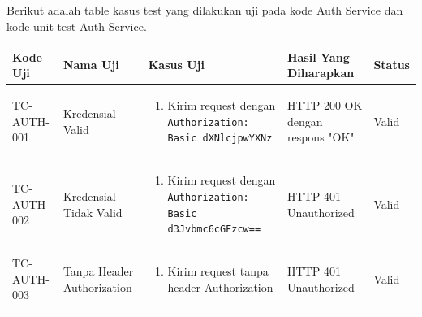 Berikut adalah table kasus test yang dilakukan uji pada kode Auth Service dan
kode unit test Auth Service.
\begin{table}[H]
  \centering
  \small
  \begin{adjustbox}{width=\textwidth}
    \begin{tabular}{|p{1.5cm}|p{3.2cm}|p{5cm}|p{3.2cm}|p{1.2cm}|}
      \hline
      \textbf{Kode Uji}                                                                & \textbf{Nama Uji}          & \textbf{Kasus Uji} & \textbf{Hasil Yang Diharapkan} & \textbf{Status} \\
      \hline
      TC-AUTH-001                                                                      & Kredensial Valid           &
      \begin{enumerate}[leftmargin=*,noitemsep,topsep=0pt,label=\arabic*.,widest=99]
        \item Kirim request dengan \texttt{Authorization: Basic dXNlcjpwYXNz}
      \end{enumerate}            &
      HTTP 200 OK dengan respons "OK"                                                  & Valid                                                                                              \\ \hline

      TC-AUTH-002                                                                      & Kredensial Tidak Valid     &
      \begin{enumerate}[leftmargin=*,noitemsep,topsep=0pt,label=\arabic*.,widest=99]
        \item Kirim request dengan \texttt{Authorization: Basic d3Jvbmc6cGFzcw==}
      \end{enumerate}        &
      HTTP 401 Unauthorized                                                            & Valid                                                                                              \\ \hline

      TC-AUTH-003                                                                      & Tanpa Header Authorization &
      \begin{enumerate}[leftmargin=*,noitemsep,topsep=0pt,label=\arabic*.,widest=99]
        \item Kirim request tanpa header Authorization
      \end{enumerate}                 &
      HTTP 401 Unauthorized                                                            & Valid                                                                                              \\ \hline


\end{tabular}
\end{adjustbox}
\end{table}
